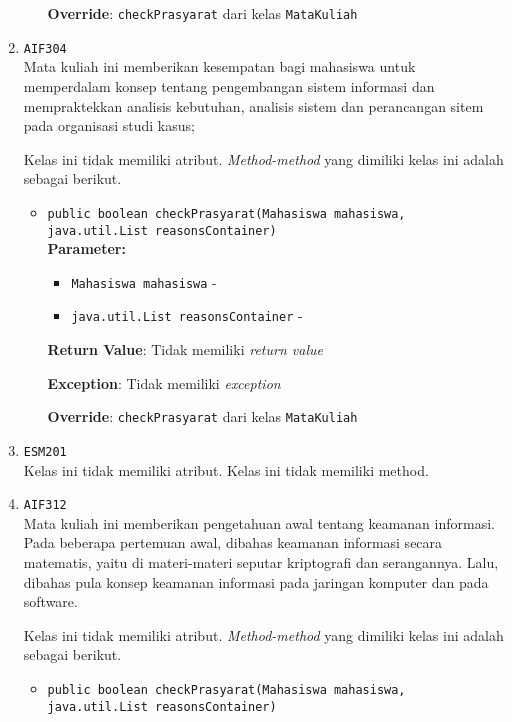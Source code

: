 \documentclass{article}
\begin{document}
\begin{enumerate}
\begin{itemize}
\textbf{Override}: \texttt{checkPrasyarat} dari kelas \texttt{MataKuliah}

\end{itemize}
\item \texttt{AIF304}\\ 
Mata kuliah ini memberikan kesempatan bagi mahasiswa untuk memperdalam konsep
 tentang pengembangan sistem informasi dan mempraktekkan analisis kebutuhan,
 analisis sistem dan perancangan sitem pada organisasi studi kasus;

Kelas ini tidak memiliki atribut. \textit{Method-method} yang dimiliki kelas ini adalah sebagai berikut.
\begin{itemize}
\item \texttt{public boolean checkPrasyarat(Mahasiswa mahasiswa, java.util.List reasonsContainer)}\\ 


\textbf{Parameter:}\begin{itemize}
\item \texttt{Mahasiswa mahasiswa} - 
\item \texttt{java.util.List reasonsContainer} - 
\end{itemize}
\textbf{Return Value}: Tidak memiliki \textit{return value}

\textbf{Exception}: Tidak memiliki \textit{exception}

\textbf{Override}: \texttt{checkPrasyarat} dari kelas \texttt{MataKuliah}

\end{itemize}
\item \texttt{ESM201}\\ 


Kelas ini tidak memiliki atribut. Kelas ini tidak memiliki method. \item \texttt{AIF312}\\ 
Mata kuliah ini memberikan pengetahuan awal tentang keamanan informasi. Pada
 beberapa pertemuan awal, dibahas keamanan informasi secara matematis, yaitu
 di materi-materi seputar kriptografi dan serangannya. Lalu, dibahas pula
 konsep keamanan informasi pada jaringan komputer dan pada software.

Kelas ini tidak memiliki atribut. \textit{Method-method} yang dimiliki kelas ini adalah sebagai berikut.
\begin{itemize}
\item \texttt{public boolean checkPrasyarat(Mahasiswa mahasiswa, java.util.List reasonsContainer)}\\ 



\end{itemize}
\end{enumerate}
\end{document}
